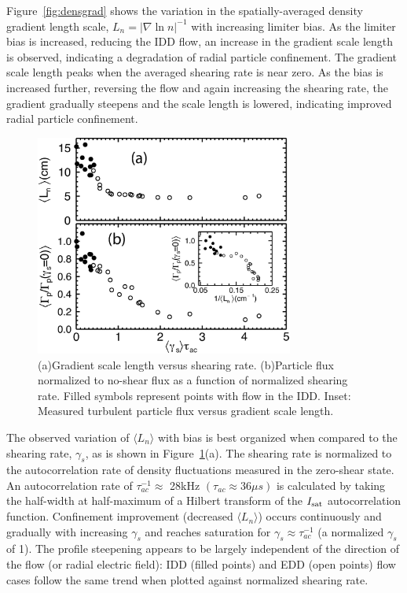 \documentclass[aip,pop,amsmath,amssymb,preprint,superscriptaddress]{revtex4-1} %
\begin{document}
Figure~\ref{fig:densgrad} shows the variation in the spatially-averaged density gradient length scale, $L_{n} = \lvert \nabla \ln n \rvert ^{-1}$ with
increasing limiter bias.  As the limiter bias is increased, reducing
the IDD flow, an increase in the gradient scale length is observed,
indicating a degradation of radial particle confinement. The gradient scale length peaks
when the averaged shearing rate is near zero. As the bias is
increased further, reversing the flow and again increasing the
shearing rate, the gradient gradually steepens and the
scale length is lowered, indicating improved radial particle confinement.  

\begin{figure}[!htbp]
\centerline{
\includegraphics[width=8.5cm]{figure3.eps}}
\caption{\label{fig:sheargradflux} (a)Gradient scale length versus shearing rate. (b)Particle flux normalized to no-shear
  flux as a function of normalized shearing rate. Filled symbols
  represent points with flow in the IDD. Inset: Measured turbulent particle flux versus
  gradient scale length.}
\end{figure}

The observed variation of $\langle L_{n} \rangle$ with bias is best
organized when compared to the shearing rate, $\gamma_{s}$, as is
shown in Figure~\ref{fig:sheargradflux}(a).   The shearing rate is
normalized to the autocorrelation rate of density fluctuations
measured in the zero-shear state.  An autocorrelation rate of $\tau_{ac}^{-1} \approx $ 28kHz $(\tau_{ac} \approx 36\mu s)$ is calculated by taking the half-width at half-maximum of a Hilbert transform of the $I_{\rm sat}$
autocorrelation function.  Confinement improvement (decreased $\langle
L_n \rangle$) occurs continuously and gradually with increasing
$\gamma_{s}$ and reaches saturation for $\gamma_{s} \approx \tau_{ac}^{-1}$ (a normalized $\gamma_{s}$ of 1).  The profile steepening
appears to be largely independent of the direction of the flow (or radial electric field): IDD (filled points) and EDD (open points) flow cases follow the same trend when plotted against normalized shearing rate.
\end{document}
